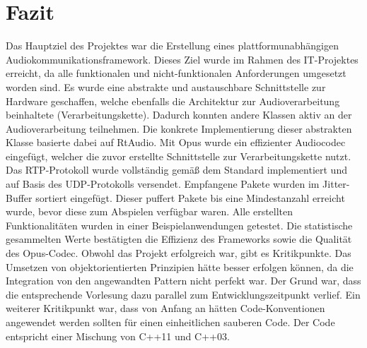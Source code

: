 \section{Fazit}
Das Hauptziel des Projektes war die Erstellung eines plattformunabhängigen Audiokommunikationsframework. Dieses Ziel wurde im Rahmen des IT-Projektes erreicht, da alle funktionalen und nicht-funktionalen Anforderungen umgesetzt worden sind.
Es wurde eine abstrakte und austauschbare Schnittstelle zur Hardware geschaffen, welche ebenfalls die Architektur zur Audioverarbeitung beinhaltete (Verarbeitungskette). Dadurch konnten andere Klassen aktiv an der Audioverarbeitung teilnehmen. Die konkrete Implementierung dieser abstrakten Klasse basierte dabei auf RtAudio.
Mit Opus wurde ein effizienter Audiocodec eingefügt, welcher die zuvor erstellte Schnittstelle zur Verarbeitungskette nutzt. Das RTP-Protokoll wurde vollständig gemäß dem Standard implementiert und auf Basis des UDP-Protokolls versendet. Empfangene Pakete wurden im Jitter-Buffer sortiert eingefügt. Dieser puffert Pakete bis eine Mindestanzahl erreicht wurde, bevor diese zum Abspielen verfügbar waren. Alle erstellten Funktionalitäten wurden in einer Beispielanwendungen getestet. Die statistische gesammelten Werte bestätigten die Effizienz des Frameworks sowie die Qualität des Opus-Codec. Obwohl das Projekt erfolgreich war, gibt es Kritikpunkte. Das Umsetzen von objektorientierten Prinzipien hätte besser erfolgen können, da die Integration von den angewandten Pattern nicht perfekt war. Der Grund war, dass die entsprechende Vorlesung dazu parallel zum Entwicklungszeitpunkt verlief. Ein weiterer Kritikpunkt war, dass von Anfang an hätten Code-Konventionen angewendet werden sollten für einen einheitlichen sauberen Code. Der Code entspricht einer Mischung von C++11 und C++03.


